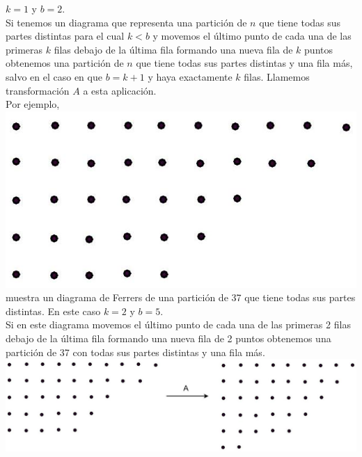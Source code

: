 \documentclass[10pt]{article}
\begin{document}
$k=1$ y $b=2$.\\
Si tenemos un diagrama que representa una partición de $n$ que tiene todas sus partes distintas para el cual $k<b$ y movemos el último punto de cada una de las primeras $k$ filas debajo de la última fila formando una nueva fila de $k$ puntos obtenemos una partición de $n$ que tiene todas sus partes distintas y una fila más, salvo en el caso en que $b=k+1$ y haya exactamente $k$ filas. Llamemos transformación $A$ a esta aplicación.\\
Por ejemplo,\\
\includegraphics[max width=\textwidth, center]{2025_09_05_3ba26226ec0baddb5a03g-35(1)}\\
muestra un diagrama de Ferrers de una partición de 37 que tiene todas sus partes distintas. En este caso $k=2$ y $b=5$.\\
Si en este diagrama movemos el último punto de cada una de las primeras 2 filas debajo de la última fila formando una nueva fila de 2 puntos obtenemos una partición de 37 con todas sus partes distintas y una fila más.\\
\includegraphics[max width=\textwidth, center]{2025_09_05_3ba26226ec0baddb5a03g-36(1)}
\end{document}
